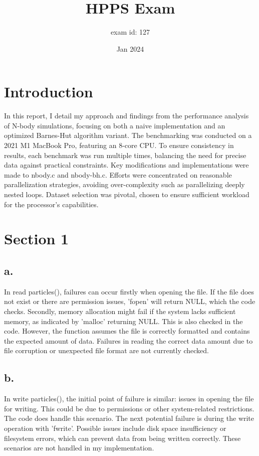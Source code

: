 \documentclass{article}
\title{HPPS Exam}
\author{exam id: 127}
\date{Jan 2024}
\begin{document}
\maketitle

\section*{Introduction}
In this report, I detail my approach and findings from the performance analysis of N-body simulations, focusing on both a naive implementation and an optimized Barnes-Hut algorithm variant. The benchmarking was conducted on a 2021 M1 MacBook Pro, featuring an 8-core CPU. To ensure consistency in results, each benchmark was run multiple times, balancing the need for precise data against practical constraints. Key modifications and implementations were made to nbody.c and nbody-bh.c. Efforts were concentrated on reasonable parallelization strategies, avoiding over-complexity such as parallelizing deeply nested loops. Dataset selection was pivotal, chosen to ensure sufficient workload for the processor's capabilities.

\section*{Section 1}
\subsection*{a.}
In read particles(), failures can occur firstly when opening the file. If the file does not exist or there are permission issues, 'fopen' will return NULL, which the code checks. Secondly, memory allocation might fail if the system lacks sufficient memory, as indicated by 'malloc' returning NULL. This is also checked in the code. However, the function assumes the file is correctly formatted and contains the expected amount of data. Failures in reading the correct data amount due to file corruption or unexpected file format are not currently checked.

\subsection*{b.}
In write particles(), the initial point of failure is similar: issues in opening the file for writing. This could be due to permissions or other system-related restrictions. The code does handle this scenario. The next potential failure is during the write operation with 'fwrite'. Possible issues include disk space insufficiency or filesystem errors, which can prevent data from being written correctly. These scenarios are not handled in my implementation.
\end{document}
